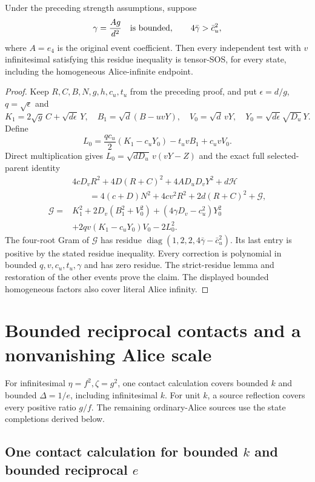 \begin{lemma}\label{lem:c1-critical-current}
Under the preceding strength assumptions, suppose
\[
 \gamma=\frac{A g}{d^2}\quad\hbox{is bounded},\qquad 4\bar\gamma>\bar c_u^2,
\]
where $A=e_4$ is the original event coefficient. Then every independent
test with $v$ infinitesimal satisfying this residue inequality is tensor-SOS, for every
state, including the homogeneous Alice-infinite endpoint.
\end{lemma}
\begin{proof}
Keep $R,C,B,N,g,h,c_u,t_u$ from the preceding proof, and put
$\epsilon=d/g$, $q=\sqrt\epsilon$ and
\[
 K_1=2\sqrt g\,C+\sqrt{d\epsilon}\,Y,\quad
 B_1=\sqrt d(B-uvY),\quad V_0=\sqrt d\,vY,
 \quad Y_0=\sqrt{d\epsilon}\sqrt{D_u}\,Y.
\]
Define
\[
 L_0=\frac{qc_u}{2}(K_1-c_uY_0)-t_uvB_1+c_uvV_0.
\]
Direct multiplication gives $L_0=\sqrt{dD_u}\,v(vY-Z)$ and the exact
full selected-parent identity
\[
\begin{split}
&4cD_vR^2+4D(R+C)^2+4AD_uD_vY^2+d\mathcal H\\
&\qquad=4(c+D)N^2+4cv^2R^2+2d(R+C)^2+\mathcal G,\\
\mathcal G={}&K_1^2+2D_v(B_1^2+V_0^2)
 +(4\gamma D_v-c_u^2)Y_0^2\\
&+2qv(K_1-c_uY_0)V_0-2L_0^2.
\end{split}
\]
The four-root Gram of $\mathcal G$ has residue
$\operatorname{diag}(1,2,2,4\bar\gamma-\bar c_u^2)$.
Its last entry is positive by the stated residue inequality. Every correction is polynomial in bounded
$q,v,c_u,t_u,\gamma$ and has zero residue. The strict-residue lemma and
restoration of the other events prove the claim. The displayed bounded
homogeneous factors also cover literal Alice infinity.
\end{proof}



\section{Bounded reciprocal contacts and a nonvanishing Alice scale}
For infinitesimal $\eta=f^2,\zeta=g^2$, one contact calculation covers bounded $k$ and bounded $\Delta=1/e$, including infinitesimal $k$. For unit $k$, a source reflection covers every positive ratio $g/f$. The remaining ordinary-Alice sources use the state completions derived below.

\subsection{One contact calculation for bounded $k$ and bounded reciprocal $e$}
\label{sec:c1-bounded-reciprocal}

